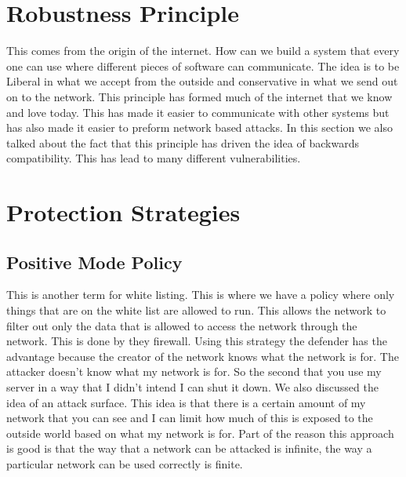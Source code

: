 \documentclass[letterpaper, onecolumn,10pt]{IEEEtran}
\begin{document}
			\section{Robustness Principle}
			This comes from the origin of the internet. How can we build a system that every one can use where different pieces of software can communicate. The idea is to be Liberal in what we accept from the outside and conservative in what we send out on to the network. This principle has formed much of the internet that we know and love today. This has made it easier to communicate with other systems but has also made it easier to preform network based attacks. In this section we also talked about the fact that this principle has driven the idea of backwards compatibility. This has lead to many different vulnerabilities.\\
			
			\section{Protection Strategies}
			    \subsection{Positive Mode Policy}
			    This is another term for white listing. This is where we have a policy where only things that are on the white list are allowed to run. This allows the network to filter out only the data that is allowed to access the network through the network. This is done by they firewall. Using this strategy the defender has the advantage because the creator of the network knows what the network is for. The attacker doesn't know what my network is for. So the second that you use my server in a way that I didn't intend I can shut it down. We also discussed the idea of an attack surface. This idea is that there is a certain amount of my network that you can see and I can limit how much of this is exposed to the outside world based on what my network is for. Part of the reason this approach is good is that the way that a network can be attacked is infinite, the way a particular network can be used correctly is finite.\\
			    
\end{document}
